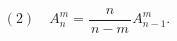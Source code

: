 \documentclass[UTF8]{ctexart}
\begin{document}
\[
(2)\quad A_n^m=\frac{n}{\,n-m\,}A_{n-1}^m.
\]
\end{document}
